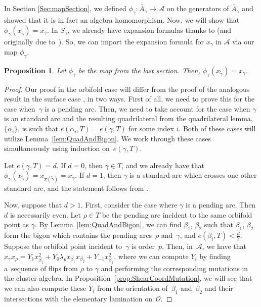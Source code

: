 \documentclass[11pt]{article}
\numberwithin{equation}{section}
\newtheorem{Proposition}[Theorem]{Proposition}
\begin{document}
In Section \ref{Sec:mapSection}, we defined $\phi_\gamma\colon \widetilde{A_\gamma} \to \mathcal{A}$ on the generators of $\widetilde{A_\gamma}$ and showed that it is in fact an algebra homomorphism. Now, we will show that $\phi_\gamma(x_{\widetilde{\gamma}}) = x_\gamma$. In $\widetilde{S_\gamma}$, we already have expansion formulas thanks to \cite{MSW} (and originally due to~\cite{Musiker-Schiffler}). So, we can import the expansion formula for $x_\gamma$ in $\mathcal{A}$ via our map $\phi_\gamma$.

\begin{Proposition}\label{Proposition5}
Let $\phi_\gamma$ be the map from the last section. Then, $\phi_\gamma(x_{\widetilde{\gamma}}) = x_\gamma$.
\end{Proposition}

\begin{proof}Our proof in the orbifold case will differ from the proof of the analogous result in the surface case \cite[Theorem~10.1]{MSW}, in two ways. First of all, we need to prove this for the case when~$\gamma$ is a pending arc. Then, we need to take account for the case when $\gamma$ is an standard arc and the resulting quadrilateral from the quadrilateral lemma, $\{\alpha_i\}$, is such that $e(\alpha_i,T) = e(\gamma,T)$ for some index $i$. Both of these cases will utilize Lemma~\ref{lem:QuadAndBigon}. We work through these cases simultaneously using induction on~$e(\gamma,T)$.

Let $e(\gamma,T) = d$. If $d = 0$, then $\gamma \in T$, and we already have that $\phi_\gamma(x_{\widetilde{\gamma}}) = x_{\pi(\widetilde{\gamma})} = x_\gamma$. If $d = 1$, then $\gamma$ is a standard arc which crosses one other standard arc, and the statement follows from \cite[Theorem~10.1]{MSW}.

Now, suppose that $d>1$. First, consider the case where $\gamma$ is a pending arc. Then $d$ is necessarily even. Let $\rho \in T$ be the pending arc incident to the same orbifold point as $\gamma$. By Lemma~\ref{lem:QuadAndBigon}, we can find $\beta_1$, $\beta_2$ such that $\beta_1$, $\beta_2$ form the bigon which contains the pending arcs~$\rho$ and~$\gamma$, and $e(\beta_i, T) < \frac{d}{2}$. Suppose the orbifold point incident to~$\gamma$ is order~$p$. Then, in~$\mathcal{A}$, we have that $x_\gamma x_\rho = Y_1 x_{\beta_1}^2 + Y_0 \lambda_p x_{\beta_1} x_{\beta_2} + Y_{-1} x_{\beta_2}^2$, where we can compute $Y_i$ by finding a~sequence of flips from $\rho$ to $\gamma$ and performing the corresponding mutations in the cluster algebra. In Proposition~\ref{prop:ShearCoordMutation}, we will see that we can also compute these $Y_i$ from the orientation of~$\beta_1$ and~$ \beta_2$ and their intersections with the elementary lamination on~$\mathcal{O}$.


\end{proof}
\end{document}
